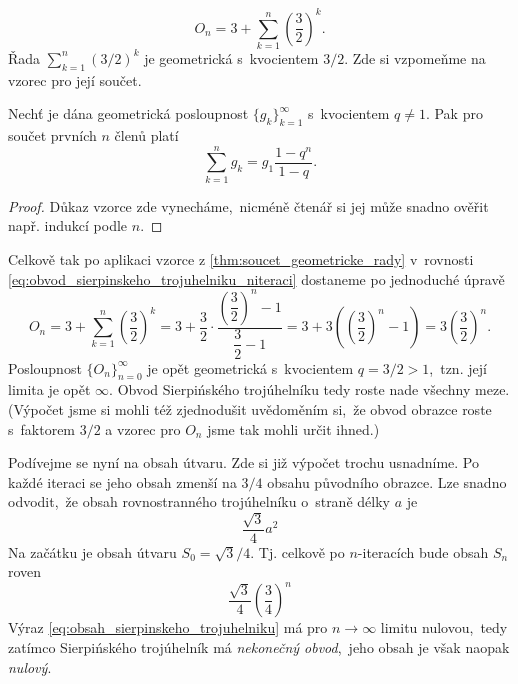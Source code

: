 \begin{equation}\label{eq:obvod_sierpinskeho_trojuhelniku_niteraci}
    O_n=3+\sum_{k=1}^n{\left(\dfrac{3}{2}\right)^k}.
\end{equation}
Řada $\sum_{k=1}^{n}(3/2)^k$ je geometrická s~kvocientem $3/2$. Zde si vzpomeňme na vzorec pro její součet.
\begin{theorem}\label{thm:soucet_geometricke_rady}
    Nechť je dána geometrická posloupnost $\{g_k\}_{k=1}^\infty$ s~kvocientem $q\neq 1$. Pak pro součet prvních $n$ členů platí
    \begin{equation*}
        \sum_{k=1}^{n}{g_k}=g_1\dfrac{1-q^n}{1-q}.
    \end{equation*}
\end{theorem}
\begin{proof}
    Důkaz vzorce zde vynecháme,~nicméně čtenář si jej může snadno ověřit např. indukcí podle $n$. 
\end{proof}
Celkově tak po aplikaci vzorce z \ref{thm:soucet_geometricke_rady} v~rovnosti \eqref{eq:obvod_sierpinskeho_trojuhelniku_niteraci} dostaneme po jednoduché úpravě
\begin{equation*}
    O_n=3+\sum_{k=1}^n{\left(\dfrac{3}{2}\right)^k}=3+\dfrac{3}{2}\cdot\dfrac{\left(\dfrac{3}{2}\right)^n-1}{\dfrac{3}{2}-1}=3+3\left(\left(\dfrac{3}{2}\right)^n-1\right)=3\left(\dfrac{3}{2}\right)^n.
\end{equation*}
Posloupnost $\{O_n\}_{n=0}^\infty$ je opět geometrická s~kvocientem $q=3/2>1$,~tzn. její limita je opět $\infty$. Obvod Sierpińského trojúhelníku tedy roste nade všechny meze. (Výpočet jsme si mohli též zjednodušit uvědoměním si,~že obvod obrazce roste s~faktorem $3/2$ a vzorec pro $O_n$ jsme tak mohli určit ihned.)\par
Podívejme se nyní na obsah útvaru. Zde si již výpočet trochu usnadníme. Po každé iteraci se jeho obsah zmenší na $3/4$ obsahu původního obrazce. Lze snadno odvodit,~že obsah rovnostranného trojúhelníku o~straně délky $a$ je
\begin{equation*}
    \dfrac{\sqrt{3}}{4}a^2
\end{equation*}
Na začátku je obsah útvaru $S_0=\sqrt{3}/4$. Tj. celkově po $n$-iteracích bude obsah $S_n$ roven
\begin{equation}\label{eq:obsah_sierpinskeho_trojuhelniku}
    \dfrac{\sqrt{3}}{4}\left(\dfrac{3}{4}\right)^n
\end{equation}
Výraz \eqref{eq:obsah_sierpinskeho_trojuhelniku} má pro $n\to\infty$ limitu nulovou,~tedy zatímco Sierpińského trojúhelník má \emph{nekonečný obvod},~jeho obsah je však naopak \emph{nulový}.

